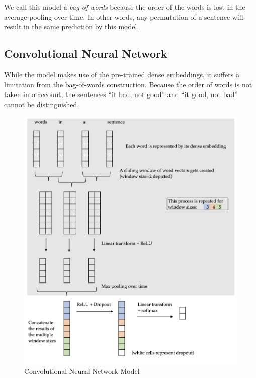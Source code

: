 \documentclass[11pt]{article}
\begin{document}
We call this model a \emph{bag of words} because the order of the words is lost
in the average-pooling over time. In other words, any permutation of a sentence
will result in the same prediction by this model. 

\subsection{Convolutional Neural Network}
\label{subsec:convnet}

While the  model makes use of the pre-trained dense
embeddings, it suffers a limitation from the bag-of-words construction. Because
the order of words is not taken into account, the sentences ``it bad, not good''
and ``it good, not bad'' cannot be distinguished. 

\begin{figure}[htb]
\centering
\includegraphics[width=\textwidth]{figs/convnet.png}
\caption{Convolutional Neural Network Model}
\label{fig:convnet}
\end{figure}
\end{document}
